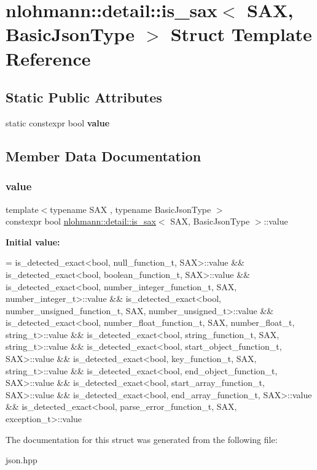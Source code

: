 \hypertarget{structnlohmann_1_1detail_1_1is__sax}{}\section{nlohmann\+:\+:detail\+:\+:is\+\_\+sax$<$ S\+AX, Basic\+Json\+Type $>$ Struct Template Reference}
\label{structnlohmann_1_1detail_1_1is__sax}
\subsection*{Static Public Attributes}
\begin{DoxyCompactItemize}
\item 
static constexpr bool {\bfseries value}
\end{DoxyCompactItemize}


\subsection{Member Data Documentation}
\mbox{\label{structnlohmann_1_1detail_1_1is__sax_a8ab7e51087000e948b4a2492257484dc}} 
\subsubsection{\texorpdfstring{value}{value}}
{\footnotesize\ttfamily template$<$typename S\+AX , typename Basic\+Json\+Type $>$ \\
constexpr bool \mbox{\hyperlink{structnlohmann_1_1detail_1_1is__sax}{nlohmann\+::detail\+::is\+\_\+sax}}$<$ S\+AX, Basic\+Json\+Type $>$\+::value\hspace{0.3cm}{\ttfamily [static]}}

{\bfseries Initial value\+:}
\begin{DoxyCode}
=
        is\_detected\_exact<bool, null\_function\_t, SAX>::value &&
        is\_detected\_exact<bool, boolean\_function\_t, SAX>::value &&
        is\_detected\_exact<bool, number\_integer\_function\_t, SAX,
        number\_integer\_t>::value &&
        is\_detected\_exact<bool, number\_unsigned\_function\_t, SAX,
        number\_unsigned\_t>::value &&
        is\_detected\_exact<bool, number\_float\_function\_t, SAX, number\_float\_t,
        string\_t>::value &&
        is\_detected\_exact<bool, string\_function\_t, SAX, string\_t>::value &&
        is\_detected\_exact<bool, start\_object\_function\_t, SAX>::value &&
        is\_detected\_exact<bool, key\_function\_t, SAX, string\_t>::value &&
        is\_detected\_exact<bool, end\_object\_function\_t, SAX>::value &&
        is\_detected\_exact<bool, start\_array\_function\_t, SAX>::value &&
        is\_detected\_exact<bool, end\_array\_function\_t, SAX>::value &&
        is\_detected\_exact<bool, parse\_error\_function\_t, SAX, exception\_t>::value
\end{DoxyCode}


The documentation for this struct was generated from the following file\+:\begin{DoxyCompactItemize}
\item 
json.\+hpp\end{DoxyCompactItemize}
